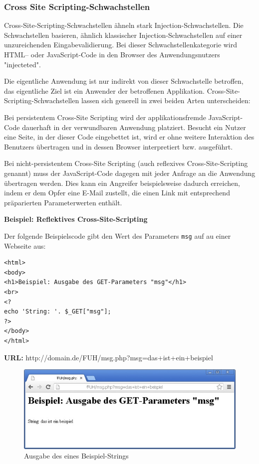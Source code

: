 \subsubsection{Cross Site Scripting-Schwachstellen}

Cross-Site-Scripting-Schwachstellen ähneln stark Injection-Schwachstellen. Die Schwachstellen basieren, ähnlich klassischer Injection-Schwachstellen auf einer unzureichenden Eingabevalidierung. Bei dieser Schwachstellenkategorie wird HTML– oder JavaScript-Code in den Browser des Anwendungsnutzers "injecteted". 

Die eigentliche Anwendung ist nur indirekt von dieser Schwachstelle betroffen, das eigentliche Ziel ist ein Anwender der betroffenen Applikation. Cross-Site-Scripting-Schwachstellen lassen sich generell in zwei beiden Arten unterscheiden:


Bei persistentem Cross-Site Scripting wird der applikationsfremde JavaScript-Code dauerhaft in der verwundbaren Anwendung platziert. Besucht ein Nutzer eine Seite, in der dieser Code eingebettet ist, wird er ohne weitere Interaktion des Benutzers übertragen und in dessen Browser interpretiert bzw. ausgeführt.


Bei nicht-persistentem Cross-Site Scripting (auch reflexives Cross-Site-Scripting genannt) muss der JavaScript-Code dagegen mit jeder Anfrage an die Anwendung übertragen werden. Dies kann ein Angreifer beispielsweise dadurch erreichen, indem er dem Opfer eine E-Mail zustellt, die einen Link mit entsprechend präparierten Parameterwerten enthält.

\textbf{Beispiel: Reflektives Cross-Site-Scripting}

Der folgende Beispielscode gibt den Wert des Parameters \texttt{msg} auf au einer Webseite aus:

\begin{lstlisting}[basicstyle=\ttfamily\footnotesize]
<html>
<body>
<h1>Beispiel: Ausgabe des GET-Parameters "msg"</h1>
<br>
<?
echo 'String: '. $_GET["msg"];
?>
</body>
</html>
\end{lstlisting}

\textbf{URL:} http://domain.de/FUH/msg.php?msg=das+ist+ein+beispiel

\begin{figure}[htbp]
 \centering
 \includegraphics[scale=.75]{abbildungen/xss_1}
 \caption{Ausgabe des eines Beispiel-Strings}
 \label{fig:xss_1} 
\end{figure}

